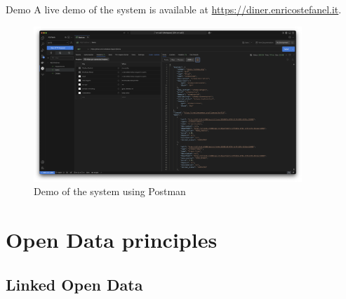 \begin{frame}{Demo}
	A live demo of the system is available at \url{https://diner.enricostefanel.it}.

	\begin{figure}
		\centering
		\includegraphics[width=0.9\textwidth,height=0.6\textheight,keepaspectratio]{images/postman.png}
		\vspace*{-1\baselineskip}
		\caption{Demo of the system using Postman}
		\label{fig:demo}
	\end{figure}
\end{frame}


\section[Open Data principles]{Open Data principles}

\subsection[Linked Open Data]{Linked Open Data}

